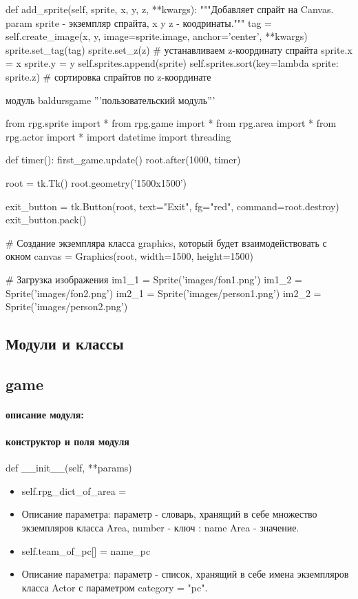 def add\_sprite(self, sprite, x, y, z, **kwargs):
"""Добавляет спрайт на Canvas.
param sprite - экземпляр спрайта, x y z - коодринаты."""
tag = self.create\_image(x, y, image=sprite.image, anchor='center', **kwargs)
sprite.set\_tag(tag)
sprite.set\_z(z)  \# устанавливаем z-координату спрайта
sprite.x = x
sprite.y = y
self.sprites.append(sprite)
self.sprites.sort(key=lambda sprite: sprite.z) \# сортировка спрайтов по z-координате

модуль baldursgame '''пользовательский модуль'''

from rpg.sprite import *
from rpg.game import *
from rpg.area import *
from rpg.actor import *
import datetime
import threading

def timer():
first\_game.update()
root.after(1000, timer)

root = tk.Tk()
root.geometry('1500x1500')

exit\_button = tk.Button(root, text="Exit", fg="red", command=root.destroy)
exit\_button.pack()

\# Создание экземпляра класса graphics, который будет взаимодействовать с окном
canvas = Graphics(root, width=1500, height=1500)

\# Загрузка изображения
im1\_1 = Sprite('images/fon1.png')
im1\_2 = Sprite('images/fon2.png')
im2\_1 = Sprite('images/person1.png')
im2\_2 = Sprite('images/person2.png')

\subsection{Модули и классы}
\subsection{game}
\paragraph{описание модуля:}
\paragraph{конструктор и поля модуля}
def \_\_init\_\_(self, **params) 
\begin{itemize}
	\item self.rpg\_dict\_of\_area = {} 
	\item Описание параметра: параметр - словарь, хранящий в себе множество экземпляров класса Area, {number - ключ : name Area - значение}.
	\item self.team\_of\_pc[] = name\_pc 
	\item Описание параметра: параметр - список, хранящий в себе имена экземпляров класса Actor с параметром category = "pc".
\end{itemize}
